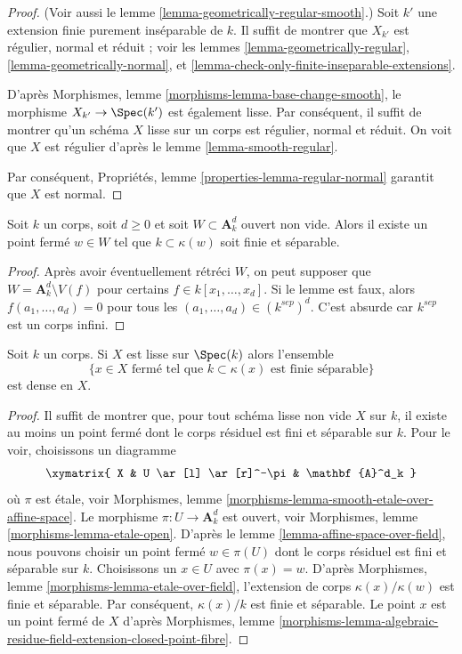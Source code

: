 \begin{proof}
 (Voir aussi
le lemme \ref{lemma-geometrically-regular-smooth}.)
Soit $k'$ une extension finie purement inséparable de $k$.
Il suffit de montrer que $X_{k'}$ est régulier, normal et réduit ; voir les
lemmes \ref{lemma-geometrically-regular}, 
\ref{lemma-geometrically-normal}, et 
\ref{lemma-check-only-finite-inseparable-extensions}.

D'après Morphismes, lemme \ref{morphisms-lemma-base-change-smooth},
le morphisme $X_{k'} \to \Spec(k')$ est également lisse.
Par conséquent, il suffit de montrer qu'un schéma $X$ lisse sur un corps est régulier,
normal et réduit. On voit que $X$ est régulier d'après
le lemme \ref{lemma-smooth-regular}.

Par conséquent, Propriétés, lemme \ref{properties-lemma-regular-normal}
 garantit que $X$ est normal. 
\end{proof}

\begin{lemma}
\label{lemma-affine-space-over-field}
 Soit $k$ un corps, soit $d \geq 0$ et soit $W \subset \mathbf{A}^d_k$
 ouvert non vide. Alors il existe un point fermé $w \in W$ tel que 
$k \subset \kappa(w)$ soit finie et séparable. 
\end{lemma}

\begin{proof}
 Après avoir éventuellement rétréci $W$, on peut supposer que 
$W = \mathbf{A}^d_k \setminus V(f)$ pour certains $f \in k[x_1, \ldots, x_d]$.
Si le lemme est faux, alors $f(a_1, \ldots, a_d) = 0$ pour tous les 
$(a_1, \ldots, a_d) \in (k^{sep})^d$. C'est absurde car $k^{sep}$
 est un corps infini. 
\end{proof}

\begin{lemma}
\label{lemma-smooth-separable-closed-points-dense}
 Soit $k$ un corps. Si $X$ est lisse sur $\Spec(k)$ alors
l'ensemble 
$$
\{x \in X\text{ fermé tel que }k \subset \kappa(x)
\text{ est finie séparable}\}
$$
 est dense en $X$. 
\end{lemma}

\begin{proof}
 Il suffit de montrer que, pour tout schéma lisse non vide $X$ sur $k$,
il existe au moins un point fermé dont le corps résiduel
est fini et séparable sur $k$. Pour le voir, choisissons un diagramme 
$$
\xymatrix{
X & U \ar[l] \ar[r]^-\pi & \mathbf{A}^d_k
}
$$
 où $\pi$ est étale, voir
Morphismes, lemme \ref{morphisms-lemma-smooth-etale-over-affine-space}.
Le morphisme $\pi : U \to \mathbf{A}^d_k$ est ouvert,
voir Morphismes, lemme \ref{morphisms-lemma-etale-open}.
D'après
le lemme \ref{lemma-affine-space-over-field},
nous pouvons choisir un point fermé $w \in \pi(U)$ dont le corps résiduel
est fini et séparable sur $k$. Choisissons un $x \in U$ avec $\pi(x) = w$.
D'après Morphismes, lemme \ref{morphisms-lemma-etale-over-field},
l'extension de corps $\kappa(x)/\kappa(w)$ est finie et séparable. Par
conséquent, $\kappa(x)/k$ est finie et séparable. Le point $x$ est
un point fermé de $X$
 d'après Morphismes, lemme 
\ref{morphisms-lemma-algebraic-residue-field-extension-closed-point-fibre}. 
\end{proof}

